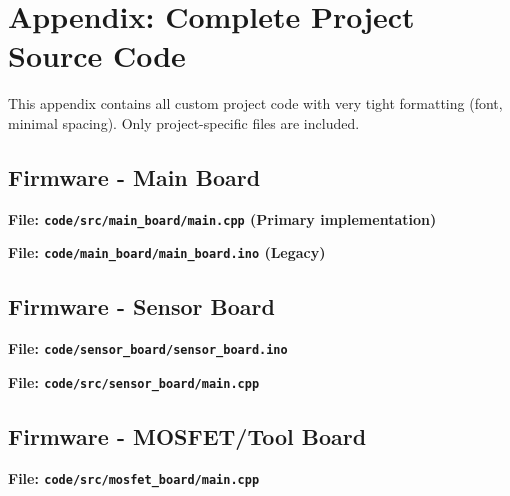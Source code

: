 % 
% 
% 
% 

\section*{Appendix: Complete Project Source Code}
\label{app:full-source}

This appendix contains all custom project code with very tight formatting (\scriptsize font, minimal spacing). Only project-specific files are included.

\subsection*{Firmware - Main Board}

\textbf{File: \texttt{code/src/main\_board/main.cpp} (Primary implementation)}



\textbf{File: \texttt{code/main\_board/main\_board.ino} (Legacy)}



\subsection*{Firmware - Sensor Board}

\textbf{File: \texttt{code/sensor\_board/sensor\_board.ino}}



\textbf{File: \texttt{code/src/sensor\_board/main.cpp}}



\subsection*{Firmware - MOSFET/Tool Board}

\textbf{File: \texttt{code/src/mosfet\_board/main.cpp}}

